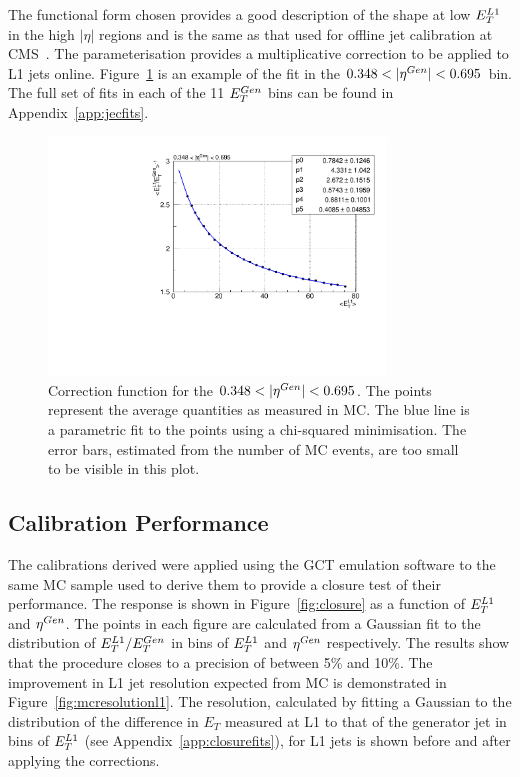 The functional form chosen provides a good description of the shape at low $E_{T}^{L1}$ in the high $|\eta|$ regions 
and is the same as that used for offline jet calibration at CMS~\citep{jetcalib}.
The parameterisation provides a multiplicative correction to be applied to L1 jets online. 
Figure~\ref{fig:egcorrfunc} is an example of the fit in the $0.348 < |\eta^{Gen}| < 0.695$ bin.
The full set of fits in each of the 11 $E_{T}^{Gen}$ bins can be found in Appendix~\ref{app:jecfits}.

\begin{figure}
\begin{center}
\includegraphics[width=0.8\textwidth]{detector/l1jet/egcorrfunc.pdf}
\end{center}
\caption{Correction function for the $0.348 < |\eta^{Gen}| < 0.695$. The points represent the average
quantities as measured in MC. The blue line is a parametric fit to the points 
using a chi-squared minimisation. The error bars, estimated from the number of MC events, are too small 
to be visible in this plot.}
\label{fig:egcorrfunc}
\end{figure}

\subsection{Calibration Performance}
The calibrations derived were applied using the GCT emulation software to the same MC sample 
used to derive them to provide a closure test of their performance. 
The response is shown in Figure~\ref{fig:closure}
as a function of $E_{T}^{L1}$ and $\eta^{Gen}$. The points in each figure are calculated from a Gaussian fit to the distribution
of $E_{T}^{L1}/E_{T}^{Gen}$ in bins of $E_{T}^{L1}$ and $\eta^{Gen}$ respectively. 
The results show that the procedure closes
to a precision of between 5\% and 10\%. The improvement in L1 jet resolution expected from MC
is demonstrated in Figure~\ref{fig:mcresolutionl1}. The resolution, calculated by fitting a Gaussian to the distribution
of the difference in $E_{T}$ measured at L1 to that of the generator jet 
in bins of $E_{T}^{L1}$ (see Appendix~\ref{app:closurefits}), for L1 jets is shown before and after applying the
corrections. 
 
